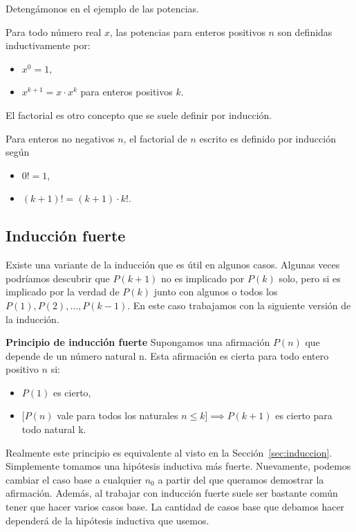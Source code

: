 \documentclass[12pt]{book}
\begin{document}
Detengámonos en el ejemplo de las potencias. 
\begin{definitionenv}\label{def:potencia}
    Para todo número real $x$, las potencias  para enteros positivos $n$ son definidas inductivamente por:
    \begin{itemize}
        \item $x^0=1,$
        \item $x^{k+1}=x\cdot x^k$ para enteros positivos $k$.
    \end{itemize}
\end{definitionenv}

El factorial es otro concepto que se suele definir por inducción.

\begin{definitionenv}
    Para enteros no negativos $n$, el factorial de $n$ escrito  es definido por inducción según
    \begin{itemize}
        \item $0!=1$,
        \item $(k+1)!=(k+1)\cdot k!$.
    \end{itemize}
\end{definitionenv}

\subsection{Inducción fuerte}
\noindent
Existe una variante de la inducción que es útil en algunos casos. Algunas veces podríamos descubrir que $P(k+1)$ no es implicado por $P(k)$ solo, pero si es implicado por la verdad de $P(k)$ junto con algunos o todos los $P(1),P(2),\dots,P(k-1)$. En este caso trabajamos con la siguiente versión de la inducción.

\begin{axiomenv}
    \textbf{Principio de inducción fuerte}
    Supongamos una afirmación $P(n)$ que depende de un número natural n. Esta afirmación es cierta para todo entero positivo $n$ si:
    \begin{itemize}
        \item $P(1)$ es cierto,
        \item $[P(n)$ vale para todos los naturales $n\leq k] \implies P(k+1)$ es cierto para todo natural k.
    \end{itemize}
\end{axiomenv}
\noindent
Realmente este principio es equivalente al visto en la Sección~\ref{sec:induccion}. Simplemente tomamos una hipótesis inductiva más fuerte. Nuevamente, podemos cambiar el caso base a cualquier $n_0$ a partir del que queramos demostrar la afirmación. Además, al trabajar con inducción fuerte suele ser bastante común tener que hacer varios casos base. La cantidad de casos base que debamos hacer dependerá de la hipótesis inductiva  que usemos.
\end{document}
